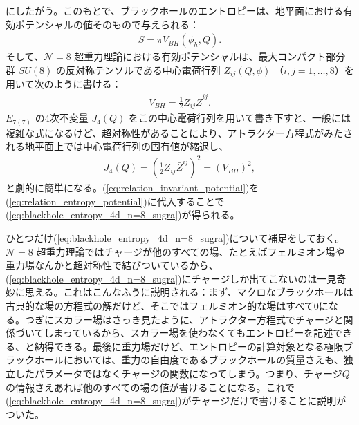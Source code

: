 \documentclass[paper=b5j,fontsize=12Q,jafontsize=12Q,baselineskip=21Q]{jlreq}
\begin{document}
\begin{refsection}
にしたがう。このもとで、ブラックホールのエントロピーは、地平面における有効ポテンシャルの値そのもので与えられる：
\begin{align}
  S = \pi V_{BH}(\phi_h, Q).\label{eq:relation_entropy_potential}
\end{align}
そして、$\mathcal{N}=8$ 超重力理論における有効ポテンシャルは、最大コンパクト部分群 $SU(8)$ の反対称テンソルである中心電荷行列 $Z_{ij}(Q, \phi)$ （$i,j = 1, \dots, 8$）を用いて次のように書ける：
\begin{align}
  V_{BH} = \frac{1}{2} Z_{ij} \bar{Z}^{ij}.
\end{align}
$E_{7(7)}$ の4次不変量 $J_4(Q)$ をこの中心電荷行列を用いて書き下すと、一般には複雑な式になるけど、超対称性があることにより、アトラクター方程式がみたされる地平面上では中心電荷行列の固有値が縮退し、
\begin{align}
  J_4(Q) = \left( \frac{1}{2} Z_{ij} \bar{Z}^{ij} \right)^2 = (V_{BH})^2,\label{eq:relation_invariant_potential}
\end{align}
と劇的に簡単になる。(\ref{eq:relation_invariant_potential})を(\ref{eq:relation_entropy_potential})に代入することで(\ref{eq:blackhole_entropy_4d_n=8_sugra})が得られる。

ひとつだけ(\ref{eq:blackhole_entropy_4d_n=8_sugra})について補足をしておく。$\mathcal{N}=8$ 超重力理論ではチャージが他のすべての場、たとえばフェルミオン場や重力場なんかと超対称性で結びついているから、(\ref{eq:blackhole_entropy_4d_n=8_sugra})にチャージしか出てこないのは一見奇妙に思える。これはこんなふうに説明される：まず、マクロなブラックホールは古典的な場の方程式の解だけど、そこではフェルミオン的な場はすべて0になる。つぎにスカラー場はさっき見たように、アトラクター方程式でチャージと関係づいてしまっているから、スカラー場を使わなくてもエントロピーを記述できる、と納得できる。最後に重力場だけど、エントロピーの計算対象となる極限ブラックホールにおいては、重力の自由度であるブラックホールの質量さえも、独立したパラメータではなくチャージの関数になってしまう。つまり、チャージ$Q$の情報さえあれば他のすべての場の値が書けることになる。これで(\ref{eq:blackhole_entropy_4d_n=8_sugra})がチャージだけで書けることに説明がついた。


\end{refsection}
\end{document}
